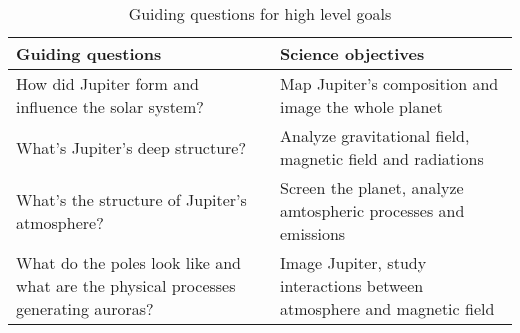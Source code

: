 \begin{table}[H]
    \renewcommand{\arraystretch}{1.5}
    \centering
    \begin{tabularx}{\linewidth}{|X|X|}
        \hline
        \textbf{Guiding questions} & \textbf{Science objectives} \\
        \hline
        How did Jupiter form and influence the solar system? & Map Jupiter's composition and image the whole planet \\ 
        \hline
        What's Jupiter's deep structure? & Analyze gravitational field, magnetic field and radiations \\
        \hline
        What's the structure of Jupiter's atmosphere? & Screen the planet, analyze amtospheric processes and emissions \\
        \hline
        What do the poles look like and what are the physical processes generating auroras? & Image Jupiter, study interactions between atmosphere and magnetic field \\
        \hline
    \end{tabularx}
    \caption{Guiding questions for high level goals}
    \label{table:goal_questions}
\end{table}